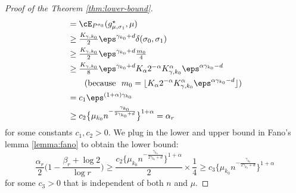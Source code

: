 \begin{proof}[Proof of the Theorem \ref{thm:lower-bound}]
\[\begin{aligned}
    &= \textstyle \cE_{P^{\sigma_0}}(g^\star_{\mu, \sigma_1}, \mu)\\
    & \textstyle  \ge \frac{ K_{\gamma, k_0} }{2} \eps^{\gamma_{k_0} + d} \delta(\sigma_0, \sigma_1)\\
   & \textstyle  \ge \frac{ K_{\gamma, k_0} }{2} \eps^{\gamma_{k_0} + d}    \frac{m_0} 4\\
    & \textstyle \ge \frac{ K_{\gamma, k_0} }{8} \eps^{\gamma_{k_0} + d}    K_\alpha 2^{-\alpha}   K_{\gamma, k_0}^\alpha \eps^{ \alpha \gamma_{k_0} -d} \\
    & \quad \quad  (\text{because} ~~ m_0 = \lfloor K_\alpha 2^{-\alpha}   K_{\gamma, k_0}^\alpha \eps^{ \alpha \gamma_{k_0} -d} \rfloor)  \\
    & \textstyle = c_1   \eps^{(1+\alpha) \gamma_{k_0}}\\
    & \textstyle \ge c_2 \big\{\mu_{k_0} n^{-\frac{\gamma_{k_0}}{2\gamma_{k_0} + d}}\big\}^{1 + \alpha}= \alpha_r 
\end{aligned}
\] for some constants $ c_1, c_2 > 0$.
We plug in the lower and upper bound in Fano's lemma \ref{lemma:fano} to obtain the lower bound: 
\[
\textstyle \frac{\alpha_r}{2} \big (1 - \frac{\beta_r + \log 2}{\log r}\big ) \ge \frac{c_2 \big\{\mu_{k_0} n^{-\frac{\gamma_{k_0}}{2\gamma_{k_0} + d}}\big\}^{1 + \alpha}}{2} \times \frac14 \ge c_3 \big\{\mu_{k_0} n^{-\frac{\gamma_{k_0}}{2\gamma_{k_0} + d}}\big\}^{1 + \alpha} 
\] for some $c_3 > 0$ that is independent of both $n$ and $\mu$. 

\end{proof}


